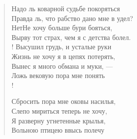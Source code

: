 \newpage
\vspace*{0cm}


\begin{verse}
\begin{altverse}
Надо ль коварной судьбе покоряться\ldotsq\\
    Правда ль, что рабство дано мне в удел?\\
Нет\ldotse Не хочу больше бури бояться,\\
	Вырву тот страх, чем я с детства болел.\\!
Высушил грудь, и усталые руки\ldotst\\
    Жизнь не хочу я в цепях потерять,\\
Вынес я много обмана и муки, ---\\
    Ложь вековую пора мне понять\ldotst\\!

Сбросить пора мне оковы насилья,\\
    Слепо мириться теперь не хочу,\\
Я разверну угнетенные крылья,\\
    Вольною птицею ввысь полечу\ldotst
\end{altverse}
\end{verse}


\newpage
\vspace*{0cm}


